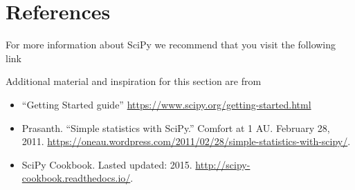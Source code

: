 \section{References}\label{references}

For more information about SciPy we recommend that you visit the following link


Additional material and inspiration for this section are from

\begin{itemize}
\item ``Getting Started guide'' \url{https://www.scipy.org/getting-started.html}
\item
  Prasanth. ``Simple statistics with SciPy.'' Comfort at 1 AU. 
  February 28, 2011.   \url{https://oneau.wordpress.com/2011/02/28/simple-statistics-with-scipy/}.
\item
  SciPy Cookbook. Lasted updated: 2015. 
  \url{http://scipy-cookbook.readthedocs.io/}. 
\end{itemize}

